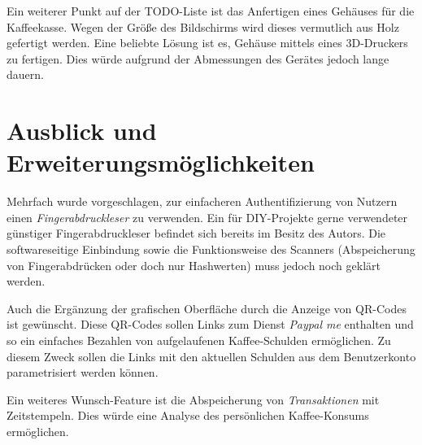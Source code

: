 \documentclass[11pt,a4paper]{IEEEtran}
\begin{document}
Ein weiterer Punkt auf der TODO-Liste ist das Anfertigen eines Gehäuses für die
Kaffeekasse. Wegen der Größe des Bildschirms wird dieses vermutlich aus Holz
gefertigt werden. Eine beliebte Lösung ist es, Gehäuse mittels eines 3D-Druckers
zu fertigen. Dies würde aufgrund der Abmessungen des Gerätes jedoch lange
dauern.

\section{Ausblick und Erweiterungsmöglichkeiten}

Mehrfach wurde vorgeschlagen, zur einfacheren Authentifizierung von Nutzern
einen \emph{Fingerabdruckleser} zu verwenden. Ein für DIY-Projekte gerne 
verwendeter günstiger Fingerabdruckleser befindet sich bereits im Besitz des
Autors. Die softwareseitige Einbindung sowie die Funktionsweise des Scanners
(Abspeicherung von Fingerabdrücken oder doch nur Hashwerten) muss jedoch noch
geklärt werden.

Auch die Ergänzung der grafischen Oberfläche durch die Anzeige von QR-Codes
ist gewünscht. Diese QR-Codes sollen Links zum Dienst \emph{Paypal me}
enthalten und so ein einfaches Bezahlen von aufgelaufenen Kaffee-Schulden
ermöglichen. Zu diesem Zweck sollen die Links mit den aktuellen Schulden
aus dem Benutzerkonto parametrisiert werden können.

Ein weiteres Wunsch-Feature ist die Abspeicherung von \emph{Transaktionen} mit
Zeitstempeln. Dies würde eine Analyse des persönlichen Kaffee-Konsums
ermöglichen. 

\printbibliography
\end{document}
